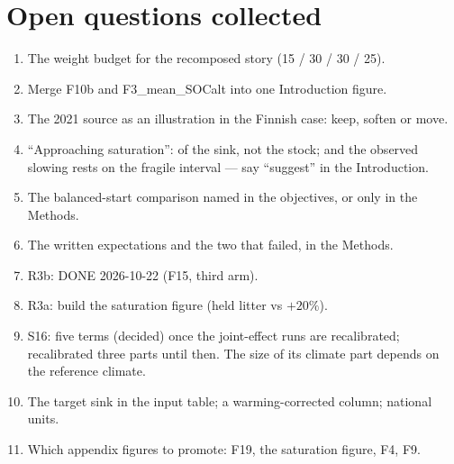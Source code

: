 \documentclass[11pt]{article}
\begin{document}
\section*{Open questions collected}
\begin{enumerate}\itemsep0pt
  \item The weight budget for the recomposed story (15 / 30 / 30 / 25).
  \item Merge F10b and F3\_mean\_SOCalt into one Introduction figure.
  \item The 2021 source as an illustration in the Finnish case: keep, soften or move.
  \item ``Approaching saturation'': of the sink, not the stock; and the observed slowing rests on the fragile
    interval --- say ``suggest'' in the Introduction.
  \item The balanced-start comparison named in the objectives, or only in the Methods.
  \item The written expectations and the two that failed, in the Methods.
  \item R3b: DONE 2026-10-22 (F15, third arm).
  \item R3a: build the saturation figure (held litter vs $+20\%$).
  \item S16: five terms (decided) once the joint-effect runs are recalibrated; recalibrated three parts until
    then. The size of its climate part depends on the reference climate.
  \item The target sink in the input table; a warming-corrected column; national units.
  \item Which appendix figures to promote: F19, the saturation figure, F4, F9.
\end{enumerate}
\end{document}
